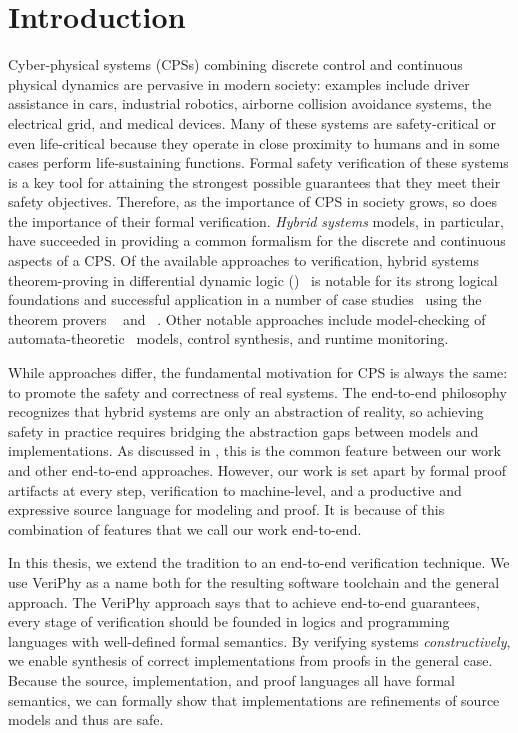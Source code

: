 \documentclass[12pt]{cmuthesis}
\theoremstyle{definition}
\theoremstyle{remark}
\newcommand{\rref}[2][]{\prettyref{#2}}
\newcommand{\VeriPhy}{VeriPhy\xspace}
\begin{document}
\chapter{Introduction}
\label{ch:introduction}
Cyber-physical systems (CPSs) combining discrete control and continuous physical dynamics are pervasive in modern society: examples include driver assistance in cars, industrial robotics, airborne collision avoidance systems, the electrical grid, and medical devices.
Many of these systems are safety-critical or even life-critical because they operate in close proximity to humans and in some cases perform life-sustaining functions.
Formal safety verification of these systems is a key tool for attaining the strongest possible guarantees that they meet their safety objectives.
Therefore, as the importance of CPS in society grows, so does the importance of their formal verification.
\emph{Hybrid systems} models, in particular, have succeeded in providing a common formalism for the discrete and continuous aspects of a CPS.
Of the available approaches to verification, hybrid systems theorem-proving in differential dynamic logic (\dL)~\cite{DBLP:books/sp/Platzer18,DBLP:journals/jar/Platzer08,DBLP:journals/jar/Platzer17,DBLP:conf/lics/Platzer12b:TR} is notable for its strong logical foundations and successful application in a number of case studies~\cite{DBLP:conf/emsoft/JeanninGKGSZP15,DBLP:conf/fm/LoosPN11,DBLP:conf/rss/MitschGP13,DBLP:conf/hybrid/PlatzerQ08} using the theorem provers \KeYmaera~\cite{DBLP:conf/cade/PlatzerQ08} and \KeYmaeraX~\cite{DBLP:conf/cade/FultonMQVP15}.
Other notable approaches include model-checking of automata-theoretic~\cite{DBLP:conf/lics/Henzinger96} models, control synthesis, and runtime monitoring.

While approaches differ, the fundamental motivation for CPS is always the same: to promote the safety and correctness of real systems.
The end-to-end philosophy recognizes that hybrid systems are only an abstraction of reality, so achieving safety in practice requires bridging the abstraction gaps between models and implementations.
As discussed in \rref{sec:end-to-end-relwork}, this is the common feature between our work and other end-to-end approaches.
However, our work is set apart by formal proof artifacts at every step, verification to machine-level, and a productive and expressive source language for modeling and proof.
It is because of this combination of features that we call our work end-to-end.

In this thesis, we extend the \dL tradition to an end-to-end verification technique.
We use \VeriPhy as a name both for the resulting software toolchain and the general approach.
The \VeriPhy approach says that to achieve end-to-end guarantees, every stage of verification should be founded in logics and programming languages with well-defined formal semantics.
By verifying systems \emph{constructively}, we enable synthesis of correct implementations from proofs in the general case.
Because the source, implementation, and proof languages all have formal semantics, we can formally show that implementations are refinements of source models and thus are safe.
\end{document}
